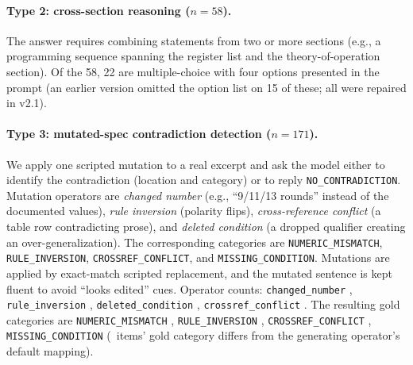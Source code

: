 \documentclass[11pt]{article}
\begin{document}
\paragraph{Type 2: cross-section reasoning ($n{=}58$).} The answer requires combining statements from two or more sections (e.g., a programming sequence spanning the register list and the theory-of-operation section). Of the 58, 22 are multiple-choice with four options presented in the prompt (an earlier version omitted the option list on 15 of these; all were repaired in v2.1).

\paragraph{Type 3: mutated-spec contradiction detection ($n{=}171$).} We apply one scripted mutation to a real excerpt and ask the model either to identify the contradiction (location and category) or to reply \texttt{NO\_CONTRADICTION}. Mutation operators are \emph{changed number} (e.g., ``9/11/13 rounds'' instead of the documented values), \emph{rule inversion} (polarity flips), \emph{cross-reference conflict} (a table row contradicting prose), and \emph{deleted condition} (a dropped qualifier creating an over-generalization). The corresponding categories are \texttt{NUMERIC\_MISMATCH}, \texttt{RULE\_INVERSION}, \texttt{CROSSREF\_CONFLICT}, and \texttt{MISSING\_CONDITION}. Mutations are applied by exact-match scripted replacement, and the mutated sentence is kept fluent to avoid ``looks edited'' cues. Operator counts: \texttt{changed\_number} \TthreeOpChangedNumber, \texttt{rule\_inversion} \TthreeOpRuleInversion, \texttt{deleted\_condition} \TthreeOpDeletedCondition, \texttt{crossref\_conflict} \TthreeOpCrossrefConflict. The resulting gold categories are \texttt{NUMERIC\_MISMATCH} \TthreeCatNumericMismatch, \texttt{RULE\_INVERSION} \TthreeCatRuleInversion, \texttt{CROSSREF\_CONFLICT} \TthreeCatCrossrefConflict, \texttt{MISSING\_CONDITION} \TthreeCatMissingCondition (\TthreeCatDiff\ items' gold category differs from the generating operator's default mapping).
\end{document}
